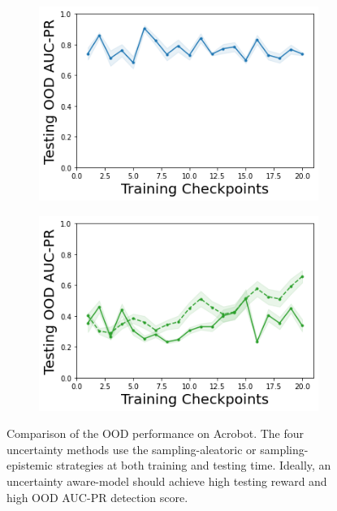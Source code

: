 \begin{figure}
\begin{subfigure}{.245\textwidth}
    \end{subfigure}
    \begin{subfigure}{.245\textwidth}
        \includegraphics[width=\textwidth]{sections/011_icml2022/resources/DKL-AcrobotOOD-v0-AUC-PR-out-epistemic_-testing-strategy.png}
    \end{subfigure}
    \begin{subfigure}{.245\textwidth}
        \includegraphics[width=\textwidth]{sections/011_icml2022/resources/PostNet-AcrobotOOD-v0-AUC-PR-out-epistemic_-testing-strategy.png}
    \end{subfigure}
        \vspace{-3mm}
    \caption{Comparison of the OOD performance on Acrobot. The four uncertainty methods use the sampling-aleatoric or sampling-epistemic strategies at both training and testing time. Ideally, an uncertainty aware-model should achieve high testing reward and high OOD AUC-PR detection score.}
    \label{fig:strategy-testing-ood-auc-pr-performance-acrobot}
        \vspace{-3mm}
\end{figure}